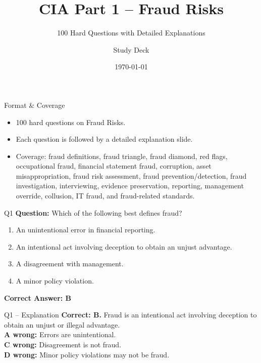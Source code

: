 \documentclass[aspectratio=169,10pt]{beamer}
\title{CIA Part 1 -- Fraud Risks}
\subtitle{100 Hard Questions with Detailed Explanations}
\author{Study Deck}
\date{\today}
\begin{document}
	
	\begin{frame}
		\titlepage
	\end{frame}
	
	\begin{frame}{Format \& Coverage}
		\small
		\begin{itemize}
			\item 100 hard questions on Fraud Risks.
			\item Each question is followed by a detailed explanation slide.
			\item Coverage: fraud definitions, fraud triangle, fraud diamond, red flags,
			occupational fraud, financial statement fraud, corruption, asset
			misappropriation, fraud risk assessment, fraud prevention/detection,
			fraud investigation, interviewing, evidence preservation, reporting,
			management override, collusion, IT fraud, and fraud-related standards.
		\end{itemize}
	\end{frame}
	
	\begin{frame}[t]{Q1}
		\small
		\textbf{Question:} Which of the following best defines fraud?
		\begin{enumerate}[label=\Alph*.,itemsep=1pt,topsep=2pt]
			\item An unintentional error in financial reporting.
			\item An intentional act involving deception to obtain an unjust advantage.
			\item A disagreement with management.
			\item A minor policy violation.
		\end{enumerate}
		\vspace{4pt}
		\textbf{Correct Answer: B}
	\end{frame}
	
	\begin{frame}[t]{Q1 -- Explanation}
		\small
		\textbf{Correct: B.} Fraud is an intentional act involving deception to obtain an unjust or illegal advantage. \\[4pt]
		\textbf{A wrong:} Errors are unintentional. \\[2pt]
		\textbf{C wrong:} Disagreement is not fraud. \\[2pt]
		\textbf{D wrong:} Minor policy violations may not be fraud.
	\end{frame}
	
\end{document}
